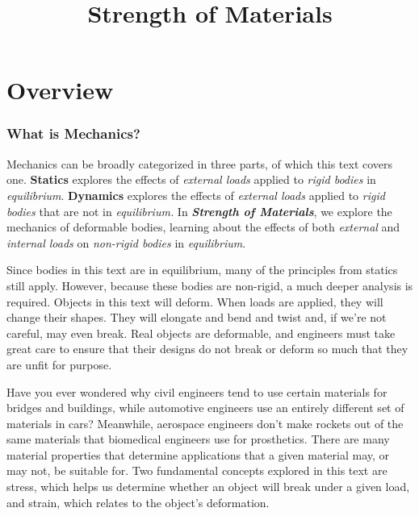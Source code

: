 \documentclass[
  letterpaper,
  DIV=11,
  numbers=noendperiod]{scrreprt}
\title{Strength of Materials}
\author{}
\date{}
\renewcommand*\contentsname{Table of contents}
\newcommand\contentsname{Table of contents}
\theoremstyle{definition}
\theoremstyle{remark}
\begin{document}
\maketitle

\renewcommand*\contentsname{Table of contents}
{
\hypersetup{linkcolor=}
\setcounter{tocdepth}{2}
\tableofcontents
}

\chapter*{Overview}\label{overview}


\subsection*{What is Mechanics?}\label{what-is-mechanics}

Mechanics can be broadly categorized in three parts, of which this text
covers one. \textbf{Statics} explores the effects of \emph{external
loads} applied to \emph{rigid bodies} in \emph{equilibrium}.
\textbf{Dynamics} explores the effects of \emph{external loads} applied
to \emph{rigid bodies} that are not in \emph{equilibrium.} In
\textbf{\emph{Strength of Materials}}, we explore the mechanics of
deformable bodies, learning about the effects of both \emph{external}
and \emph{internal loads} on \emph{non-rigid bodies} in
\emph{equilibrium}.

Since bodies in this text are in equilibrium, many of the principles
from statics still apply. However, because these bodies are non-rigid, a
much deeper analysis is required. Objects in this text will deform. When
loads are applied, they will change their shapes. They will elongate and
bend and twist and, if we're not careful, may even break. Real objects
are deformable, and engineers must take great care to ensure that their
designs do not break or deform so much that they are unfit for purpose.

Have you ever wondered why civil engineers tend to use certain materials
for bridges and buildings, while automotive engineers use an entirely
different set of materials in cars? Meanwhile, aerospace engineers don't
make rockets out of the same materials that biomedical engineers use for
prosthetics. There are many material properties that determine
applications that a given material may, or may not, be suitable for. Two
fundamental concepts explored in this text are stress, which helps us
determine whether an object will break under a given load, and strain,
which relates to the object's deformation.
\end{document}
